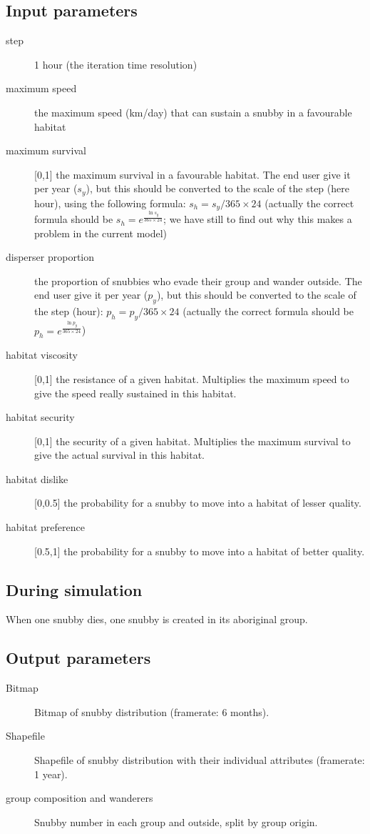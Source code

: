 \subsection{Input parameters}
\begin{description}
	\item[step] 1 hour (the iteration time resolution)
	\item[maximum speed] the maximum speed (km/day) that can sustain a snubby in a favourable habitat
	\item[maximum survival]  [0,1] the maximum survival in a favourable habitat. The end user give it per year ($s_y$), but this should be converted to the scale of the step (here hour), using the following formula: $s_h=s_y/365\times24$ (actually the correct formula should be $s_h=e^{\frac{\ln{s_y}}{365\times24}}$; we have still to find out why this makes a problem in the current model)
	\item[disperser proportion] the proportion of snubbies who evade their group and wander outside. The end user give it per year  ($p_y$), but this should be converted to the scale of the step (hour): $p_h=p_y/365\times24$ (actually the correct formula should be $p_h=e^{\frac{\ln{p_y}}{365\times24}}$)
	\item[habitat viscosity] [0,1] the resistance of a given habitat.  Multiplies the maximum speed to give the speed really sustained in this habitat.
	\item[habitat security] [0,1] the security of a given habitat.  Multiplies the maximum survival to give the actual survival in this habitat.
	\item[habitat dislike] [0,0.5] the probability for a snubby to move into a habitat of lesser quality.
	\item[habitat preference] [0.5,1] the probability for a snubby to move into a habitat of better quality.
	
\end{description}

\subsection{During simulation}
When one snubby dies, one snubby is created in its aboriginal group.


\subsection{Output parameters}

\begin{description}
	\item[Bitmap] Bitmap of snubby distribution (framerate: 6 months).
	\item[Shapefile] Shapefile of snubby distribution with their individual attributes (framerate: 1 year).
	\item[group composition and wanderers] Snubby number in each group and outside, split by group origin.
	
\end{description}





